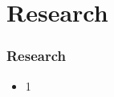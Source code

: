 \section{Research}
\begin{frame}\frametitle{Research}
	\begin{itemize}
		\item 1
	\end{itemize}
\end{frame}